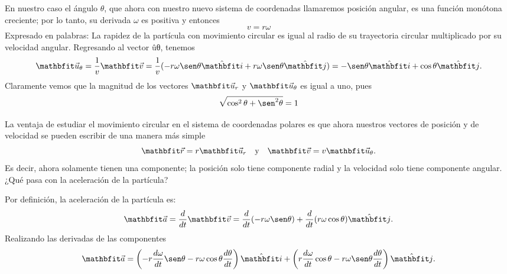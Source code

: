 En nuestro caso el ángulo $\theta$, que ahora con nuestro nuevo sistema de coordenadas llamaremos
posición angular, es una función monótona creciente; por lo tanto, su derivada $\omega$ es positiva y
entonces
$$v = r\omega$$
Expresado en palabras: La rapidez de la partícula con movimiento circular es igual al radio de su trayectoria circular multiplicado por su velocidad angular. Regresando al vector ûθ, tenemos
$$\velou_\theta = \frac{1}{v}\veloi = \frac{1}{v}(-r\omega\sen\theta\veci + r\omega\sen\theta\vecj) = -\sen\theta\veci + \cos\theta\vecj.$$
Claramente vemos que la magnitud de los vectores $\velou_r$ y $\velou_\theta$ es igual a uno, pues
$$\sqrt{\cos^2\theta + \sen^2\theta} = 1$$

La ventaja de estudiar el movimiento circular en el sistema de coordenadas polares es que ahora nuestros vectores de posición y de velocidad se pueden escribir de una manera más simple
$$\vecr = r\velou_r \quad \text{y} \quad \veloi = v\velou_\theta.$$
Es decir, ahora solamente tienen una componente; la posición solo tiene componente radial y la velocidad solo tiene componente angular. ¿Qué pasa con la aceleración de la partícula?

Por definición, la aceleración de la partícula es:
$$\acei = \frac{d}{dt}\veloi = \frac{d}{dt}(-r\omega\sen\theta) + \frac{d}{dt}(r\omega\cos\theta)\vecj.$$
Realizando las derivadas de las componentes
$$\acei = \left(-r\frac{d\omega}{dt}\sen\theta - r\omega\cos\theta\frac{d\theta}{dt}\right)\veci + \left(r\frac{d\omega}{dt}\cos\theta - r\omega\sen\theta\frac{d\theta}{dt}\right)\vecj.$$

